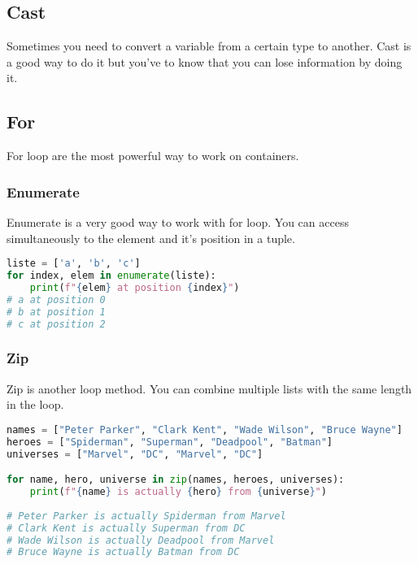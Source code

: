 \documentclass[a4paper, 12pt]{article}
\begin{document}
\subsection{Cast}
Sometimes you need to convert a variable from a certain type to another. Cast is a good way to do it but you've to know that you can lose information by doing it.

\subsection{For}
For loop are the most powerful way to work on containers.
\subsubsection{Enumerate}
Enumerate is a very good way to work with for loop. You can access simultaneously to the element and it's position in a tuple.
\begin{lstlisting}[language=Python]
liste = ['a', 'b', 'c']
for index, elem in enumerate(liste):
	print(f"{elem} at position {index}")
# a at position 0
# b at position 1
# c at position 2
\end{lstlisting}

\subsubsection{Zip}
Zip is another loop method. You can combine multiple lists with the same length in the loop. 
\begin{lstlisting}[language=Python]
names = ["Peter Parker", "Clark Kent", "Wade Wilson", "Bruce Wayne"]
heroes = ["Spiderman", "Superman", "Deadpool", "Batman"]
universes = ["Marvel", "DC", "Marvel", "DC"]

for name, hero, universe in zip(names, heroes, universes):
	print(f"{name} is actually {hero} from {universe}")
	
# Peter Parker is actually Spiderman from Marvel
# Clark Kent is actually Superman from DC
# Wade Wilson is actually Deadpool from Marvel
# Bruce Wayne is actually Batman from DC
\end{lstlisting}
\end{document}
